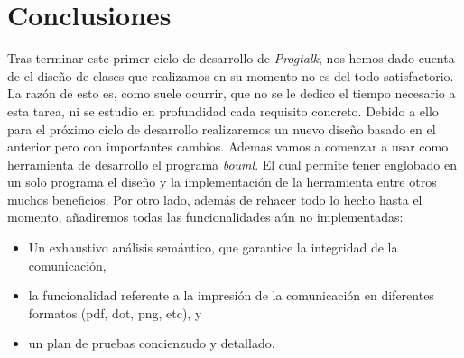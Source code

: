 \documentclass{article}
\begin{document}
\section{Conclusiones}

Tras terminar este primer ciclo de desarrollo de \textit{Progtalk}, nos hemos dado cuenta de el diseño de clases que realizamos en su momento no es del todo satisfactorio. La razón de esto es, como suele ocurrir, que no se le dedico el tiempo necesario a esta tarea, ni se estudio en profundidad cada requisito concreto. Debido a ello para el próximo ciclo de desarrollo realizaremos un nuevo diseño basado en el anterior pero con importantes cambios. Ademas vamos a comenzar a usar como herramienta de desarrollo el programa \textit{bouml}. El cual permite tener englobado en un solo programa el diseño y la implementación de la herramienta entre otros muchos beneficios. Por otro lado, además de rehacer todo lo hecho hasta el momento, añadiremos todas las funcionalidades aún no implementadas:

\begin{itemize}
\item Un exhaustivo análisis semántico, que garantice la integridad de la comunicación,
\item la funcionalidad referente a la impresión de la comunicación en diferentes formatos (pdf, dot, png, etc), y
\item un plan de pruebas concienzudo y detallado.
\end{itemize}
\end{document}
